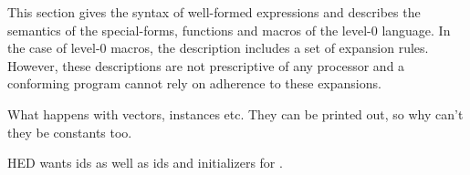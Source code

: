 %
\label{control-0}
%
\begin{optDefinition}
\noindent
This section gives the syntax of well-formed expressions and describes the
semantics of the special-forms, functions and macros of the level-0 language.
In the case of level-0 macros, the description includes a set of expansion
rules.  However, these descriptions are not prescriptive of any processor and a
conforming program cannot rely on adherence to these expansions.
\end{optDefinition}

%
\begin{optPrivate}
    What happens with vectors, instances etc.  They can be printed out, so why
    can't they be constants too.

    HED wants ids as well as ids and initializers for .
\end{optPrivate}
%
